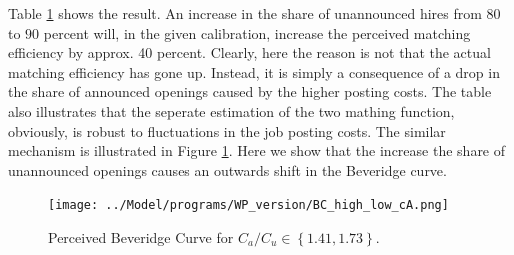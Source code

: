 \documentclass[11pt,article]{memoir}
\begin{document}
Table \ref{fig:perceived_BC_high_low_cA} shows the result. An increase in the share of unannounced hires from $80$ to $90$ percent will, in the given calibration, increase the perceived matching efficiency by approx. 40 percent. Clearly, here the reason is not that the actual matching efficiency has gone up. Instead, it is simply a consequence of a drop in the share of announced openings caused by the higher posting costs. The table also illustrates that the seperate estimation of the two mathing function, obviously, is robust to fluctuations in the job posting costs. The similar mechanism is illustrated in Figure \ref{fig:perceived_BC_high_low_cA}. Here we show that the increase the share of unannounced openings causes an outwards shift in the Beveridge curve.




\begin{figure}[p!]
\texttt{[image: ../Model/programs/WP\_version/BC\_high\_low\_cA.png]}
\caption{Perceived Beveridge Curve for $C_a/C_u \in \left\{ 1.41, 1.73 \right\}$.}
\label{fig:perceived_BC_high_low_cA}
\end{figure}
\end{document}
